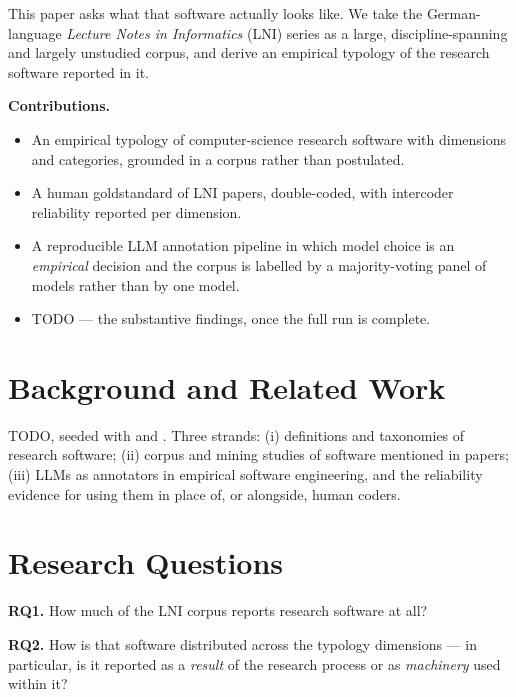 \documentclass[
        pdflatex,sn-basic,lineno
    ]{sn-jnl}
\providecommand{\tightlist}{%
    \setlength{\itemsep}{0pt}\setlength{\parskip}{0pt}}
\begin{document}
    This paper asks what that software actually looks like. We take the
    German-language \emph{Lecture Notes in Informatics} (LNI) series as
    a large, discipline-spanning and largely unstudied corpus, and
    derive an empirical typology of the research software reported in
    it.

    \textbf{Contributions.}

    \begin{itemize}
    \tightlist
    \item
      An empirical typology of computer-science research software with
      \NumDimensions dimensions and \NumCategories categories, grounded
      in a corpus rather than postulated.
    \item
      A human goldstandard of LNI papers, double-coded, with intercoder
      reliability reported per dimension.
    \item
      A reproducible LLM annotation pipeline in which model choice is an
      \emph{empirical} decision and the corpus is labelled by a
      majority-voting panel of \PanelSize models rather than by one
      model.
    \item
      TODO --- the substantive findings, once the full run is complete.
    \end{itemize}

    \section{Background and Related
    Work}\label{background-and-related-work}

    TODO, seeded with
    \citet{hasselbringMultiDimensionalCategorizationResearch2024} and
    \citet{feldererInvestigatingResearchSoftware2025b}. Three strands:
    (i) definitions and taxonomies of research software; (ii) corpus and
    mining studies of software mentioned in papers; (iii) LLMs as
    annotators in empirical software engineering, and the reliability
    evidence for using them in place of, or alongside, human coders.

    \section{Research Questions}\label{research-questions}

    \textbf{RQ1.} How much of the LNI corpus reports research software
    at all?

    \textbf{RQ2.} How is that software distributed across the
    \NumDimensions typology dimensions --- in particular, is it reported
    as a \emph{result} of the research process or as \emph{machinery}
    used within it?
\end{document}
